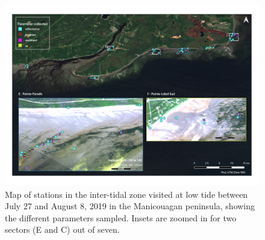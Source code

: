 \documentclass[essd, manuscript]{copernicus}
\begin{document}
\begin{figure}
    \centering
    \includegraphics[width=18cm]{Figures/Fig2b_annexe_intertidal_E_F_v2.png}
    \caption{Map of stations in the inter-tidal zone visited at low tide between July 27 and August 8, 2019 in the Manicouagan peninsula, showing the different parameters sampled. Insets are zoomed in for two sectors (E and C) out of seven. }
    \label{fig:intertidal2_annexe}
\end{figure}



\noappendix       %




\appendixfigures  %
\end{document}
